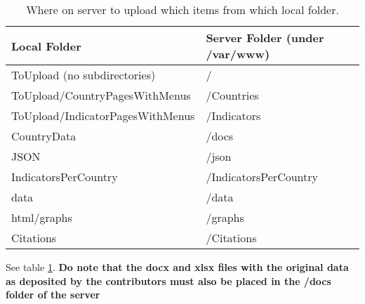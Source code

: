 \documentclass[a4paper]{article}
\begin{document}
\begin{table}[h]
\centering
\caption{Where on server to upload which items from which local folder.}
\label{tab:uncertainty}
\begin{tabular}{l | l}
  \toprule
  Local Folder & Server Folder (under /var/www) \\
  \midrule
  ToUpload (no subdirectories) & / \\
  ToUpload/CountryPagesWithMenus & /Countries \\
  ToUpload/IndicatorPagesWithMenus & /Indicators \\
  CountryData & /docs \\
  JSON & /json \\
  IndicatorsPerCountry & /IndicatorsPerCountry \\
  data & /data \\
  html/graphs & /graphs \\
  Citations & /Citations \\
  \bottomrule
\end{tabular}
\end{table}

See table \ref{tab:uncertainty}. \textbf{Do note that the docx and xlsx files with the original data as 
deposited 
by the contributors must also be placed in the /docs folder of the server}

\iffalse
\end{document}
